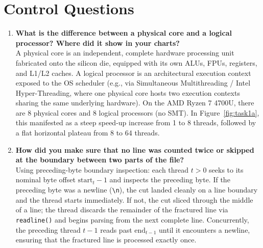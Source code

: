 \documentclass{labreport}
\begin{document}
\vspace{0.5cm}

\section{Control Questions}

\begin{enumerate}
    \item \textbf{What is the difference between a physical core and a logical processor? Where did it show in your charts?}\\
    A physical core is an independent, complete hardware processing unit fabricated onto the silicon die, equipped with its own ALUs, FPUs, registers, and L1/L2 caches. A logical processor is an architectural execution context exposed to the OS scheduler (e.g., via Simultaneous Multithreading / Intel Hyper-Threading, where one physical core hosts two execution contexts sharing the same underlying hardware). On the AMD Ryzen 7 4700U, there are 8 physical cores and 8 logical processors (no SMT). In Figure~\ref{fig:task1a}, this manifested as a steep speed-up increase from 1 to 8 threads, followed by a flat horizontal plateau from 8 to 64 threads.

    \item \textbf{How did you make sure that no line was counted twice or skipped at the boundary between two parts of the file?}\\
    Using preceding-byte boundary inspection: each thread $t > 0$ seeks to its nominal byte offset $\text{start}_t - 1$ and inspects the preceding byte. If the preceding byte was a newline (\texttt{\textbackslash n}), the cut landed cleanly on a line boundary and the thread starts immediately. If not, the cut sliced through the middle of a line; the thread discards the remainder of the fractured line via \texttt{readline()} and begins parsing from the next complete line. Concurrently, the preceding thread $t - 1$ reads past $\text{end}_{t-1}$ until it encounters a newline, ensuring that the fractured line is processed exactly once.


\end{enumerate}
\end{document}

